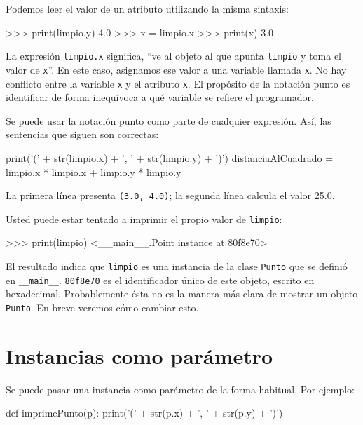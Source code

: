 Podemos leer el valor de un atributo utilizando la misma sintaxis:

\begin{pyconcode}
>>> print(limpio.y)
4.0
>>> x = limpio.x
>>> print(x)
3.0
\end{pyconcode}

La expresión \texttt{limpio.x} significa, ``ve al objeto al que apunta
\texttt{limpio} y toma el valor de \texttt{x}''. En este caso, asignamos
ese valor a una variable llamada \texttt{x}. No hay conflicto entre
la variable \texttt{x} y el atributo \texttt{x}. El propósito de la
notación punto es identificar de forma inequívoca a qué variable se
refiere el programador.

Se puede usar la notación punto como parte de cualquier expresión.
Así, las sentencias que siguen son correctas:
\begin{pythoncode}
print('(' + str(limpio.x) + ', ' + str(limpio.y) + ')')
distanciaAlCuadrado = limpio.x * limpio.x + 
                      limpio.y * limpio.y
\end{pythoncode}

La primera línea presenta \texttt{(3.0, 4.0)}; la segunda línea calcula
el valor 25.0.

Usted puede estar tentado a imprimir el propio valor de \texttt{limpio}:
\begin{pyconcode}
>>> print(limpio)
<__main__.Point instance at 80f8e70>
\end{pyconcode}

El resultado indica que \texttt{limpio} es una instancia de la clase
\texttt{Punto} que se definió en \texttt{\_\_main\_\_}. \texttt{80f8e70}
es el identificador único de este objeto, escrito en hexadecimal.
Probablemente ésta no es la manera más clara de mostrar un objeto
\texttt{Punto}. En breve veremos cómo cambiar esto.


\section{Instancias como parámetro}

 

Se puede pasar una instancia como parámetro de la forma habitual.
Por ejemplo:
\begin{pyconcode}
def imprimePunto(p):
  print('(' + str(p.x) + ', ' + str(p.y) + ')')
\end{pyconcode}

